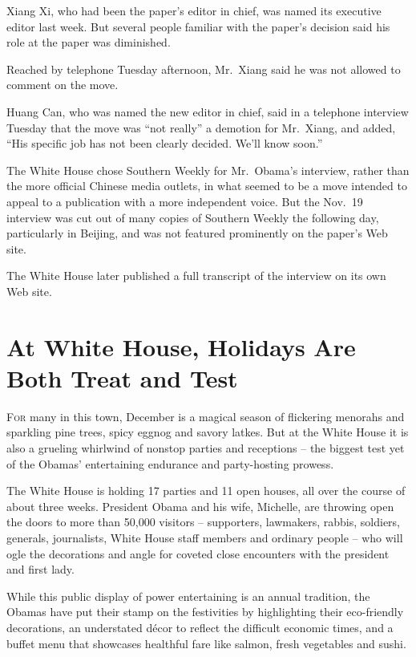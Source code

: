 ﻿\documentclass[12pt]{article}
\begin{document}
Xiang Xi, who had been the paper's editor in chief, was named its executive editor last week. But
several people familiar with the paper's decision said his role at the paper was diminished.

Reached by telephone Tuesday afternoon, Mr.~Xiang said he was not allowed to comment on the move.

Huang Can, who was named the new editor in chief, said in a telephone interview Tuesday that the
move was ``not really'' a demotion for Mr.~Xiang, and added, ``His specific job has not been clearly
decided. We'll know soon.''

The White House chose Southern Weekly for Mr.~Obama's interview, rather than the more official
Chinese media outlets, in what seemed to be a move intended to appeal to a publication with a more
independent voice. But the Nov.~19 interview was cut out of many copies of Southern Weekly the
following day, particularly in Beijing, and was not featured prominently on the paper's Web site.

The White House later published a full transcript of the interview on its own Web site.

\section{At White House, Holidays Are Both Treat and Test}

\lettrine{F}{or} many in this town, December is a magical season of
flickering menorahs and sparkling pine trees, spicy eggnog and savory latkes. But at the White House
it is also a grueling whirlwind of nonstop parties and receptions -- the biggest test yet of the
Obamas' entertaining endurance and party-hosting prowess.

The White House is holding 17 parties and 11 open houses, all over the course of about three weeks.
President Obama and his wife, Michelle, are throwing open the doors to more than 50,000 visitors --
supporters, lawmakers, rabbis, soldiers, generals, journalists, White House staff members and
ordinary people -- who will ogle the decorations and angle for coveted close encounters with the
president and first lady.

While this public display of power entertaining is an annual tradition, the Obamas have put their
stamp on the festivities by highlighting their eco-friendly decorations, an understated d\'ecor to
reflect the difficult economic times, and a buffet menu that showcases healthful fare like salmon,
fresh vegetables and sushi.
\end{document}
